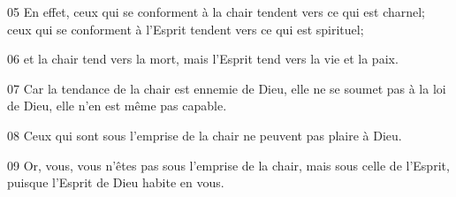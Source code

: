 
05 En effet, ceux qui se conforment à la chair tendent vers ce qui est charnel; ceux qui se conforment à l’Esprit tendent vers ce qui est spirituel;

06 et la chair tend vers la mort, mais l’Esprit tend vers la vie et la paix.

07 Car la tendance de la chair est ennemie de Dieu, elle ne se soumet pas à la loi de Dieu, elle n’en est même pas capable.

08 Ceux qui sont sous l’emprise de la chair ne peuvent pas plaire à Dieu.

09 Or, vous, vous n’êtes pas sous l’emprise de la chair, mais sous celle de l’Esprit, puisque l’Esprit de Dieu habite en vous. 